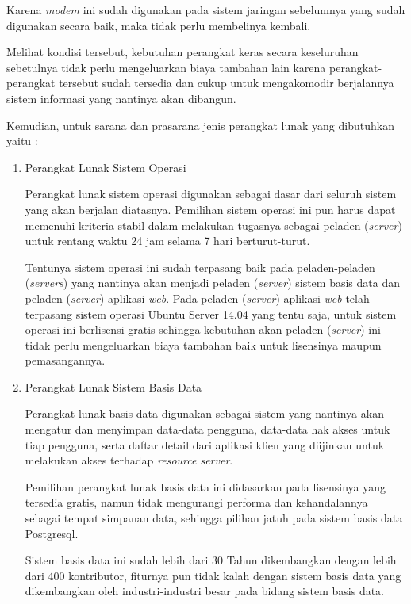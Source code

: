 \documentclass[pdftex,12pt, oneside]{article}
\begin{document}
\begin{enumerate}
Karena \textit{modem} ini sudah digunakan pada sistem jaringan sebelumnya yang sudah digunakan secara baik, maka tidak perlu membelinya kembali.
	
\end{enumerate}

Melihat kondisi tersebut, kebutuhan perangkat keras secara keseluruhan sebetulnya tidak perlu mengeluarkan biaya tambahan lain karena perangkat-perangkat tersebut sudah tersedia dan cukup untuk mengakomodir berjalannya sistem informasi yang nantinya akan dibangun.

Kemudian, untuk sarana dan prasarana jenis perangkat lunak yang dibutuhkan yaitu :

\begin{enumerate}
	\item Perangkat Lunak Sistem Operasi

Perangkat lunak sistem operasi digunakan sebagai dasar dari seluruh sistem yang akan berjalan diatasnya. Pemilihan sistem operasi ini pun harus dapat memenuhi kriteria stabil dalam melakukan tugasnya sebagai peladen (\textit{server}) untuk rentang waktu 24 jam selama 7 hari berturut-turut.

Tentunya sistem operasi ini sudah terpasang baik pada peladen-peladen (\textit{servers}) yang nantinya akan menjadi peladen (\textit{server}) sistem basis data dan peladen (\textit{server}) aplikasi \textit{web}. Pada peladen (\textit{server}) aplikasi \textit{web} telah terpasang sistem operasi Ubuntu Server 14.04 yang tentu saja, untuk sistem operasi ini berlisensi gratis sehingga kebutuhan akan peladen (\textit{server}) ini tidak perlu mengeluarkan biaya tambahan baik untuk lisensinya maupun pemasangannya.

\item Perangkat Lunak Sistem Basis Data
	
Perangkat lunak basis data digunakan sebagai sistem yang nantinya akan mengatur dan menyimpan data-data pengguna, data-data hak akses untuk tiap pengguna, serta daftar detail dari aplikasi klien yang diijinkan untuk melakukan akses terhadap \textit{resource server}. 

Pemilihan perangkat lunak basis data ini didasarkan pada lisensinya yang tersedia gratis, namun tidak mengurangi performa dan kehandalannya sebagai tempat simpanan data, sehingga pilihan jatuh pada sistem basis data Postgresql.

Sistem basis data ini sudah lebih dari 30 Tahun dikembangkan dengan lebih dari 400 kontributor, fiturnya pun tidak kalah dengan sistem basis data yang dikembangkan oleh industri-industri besar pada bidang sistem basis data.


\end{enumerate}
\end{document}
